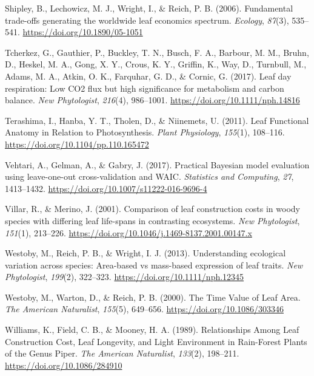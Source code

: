 \documentclass[
  12pt,
  a4paper,
,tablecaptionabove
]{scrartcl}
\newlength{\cslhangindent}
\newenvironment{CSLReferences}[2] %
 {%
  \setlength{\parindent}{0pt}
  \ifodd #1 \everypar{\setlength{\hangindent}{\cslhangindent}}\ignorespaces\fi
  \ifnum #2 > 0
  \setlength{\parskip}{#2\baselineskip}
  \fi
 }%
 {}
\begin{document}
\begin{CSLReferences}{1}{0}
\leavevmode{}%
Shipley, B., Lechowicz, M. J., Wright, I., \& Reich, P. B. (2006).
Fundamental trade-offs generating the worldwide leaf economics spectrum.
\emph{Ecology}, \emph{87}(3), 535--541.
\url{https://doi.org/10.1890/05-1051}

\leavevmode{}%
Tcherkez, G., Gauthier, P., Buckley, T. N., Busch, F. A., Barbour, M.
M., Bruhn, D., Heskel, M. A., Gong, X. Y., Crous, K. Y., Griffin, K.,
Way, D., Turnbull, M., Adams, M. A., Atkin, O. K., Farquhar, G. D., \&
Cornic, G. (2017). Leaf day respiration: Low {CO2} flux but high
significance for metabolism and carbon balance. \emph{New Phytologist},
\emph{216}(4), 986--1001. \url{https://doi.org/10.1111/nph.14816}

\leavevmode{}%
Terashima, I., Hanba, Y. T., Tholen, D., \& Niinemets, U. (2011). Leaf
{Functional Anatomy} in {Relation} to {Photosynthesis}. \emph{Plant
Physiology}, \emph{155}(1), 108--116.
\url{https://doi.org/10.1104/pp.110.165472}

\leavevmode{}%
Vehtari, A., Gelman, A., \& Gabry, J. (2017). Practical {Bayesian} model
evaluation using leave-one-out cross-validation and {WAIC}.
\emph{Statistics and Computing}, \emph{27}, 1413--1432.
\url{https://doi.org/10.1007/s11222-016-9696-4}

\leavevmode{}%
Villar, R., \& Merino, J. (2001). Comparison of leaf construction costs
in woody species with differing leaf life-spans in contrasting
ecosystems. \emph{New Phytologist}, \emph{151}(1), 213--226.
\url{https://doi.org/10.1046/j.1469-8137.2001.00147.x}

\leavevmode{}%
Westoby, M., Reich, P. B., \& Wright, I. J. (2013). Understanding
ecological variation across species: {Area-based} vs mass-based
expression of leaf traits. \emph{New Phytologist}, \emph{199}(2),
322--323. \url{https://doi.org/10.1111/nph.12345}

\leavevmode{}%
Westoby, M., Warton, D., \& Reich, P. B. (2000). The {Time Value} of
{Leaf Area}. \emph{The American Naturalist}, \emph{155}(5), 649--656.
\url{https://doi.org/10.1086/303346}

\leavevmode{}%
Williams, K., Field, C. B., \& Mooney, H. A. (1989). Relationships
{Among Leaf Construction Cost}, {Leaf Longevity}, and {Light
Environment} in {Rain-Forest Plants} of the {Genus Piper}. \emph{The
American Naturalist}, \emph{133}(2), 198--211.
\url{https://doi.org/10.1086/284910}


\end{CSLReferences}
\end{document}
